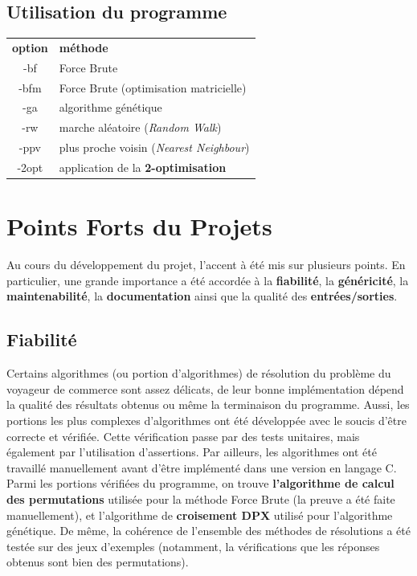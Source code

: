 \documentclass[11pt]{article}
\begin{document}
\subsection*{Utilisation du programme}

\begin{tabular}{ | c | l | }
	\textbf{option}	& \textbf{méthode} \\
	-bf		& Force Brute \\
	-bfm	& Force Brute (optimisation matricielle) \\
	-ga		& algorithme génétique \\
	-rw		& marche aléatoire (\textit{Random Walk}) \\
	-ppv		& plus proche voisin (\textit{Nearest Neighbour}) \\
	-2opt 	& application de la \textbf{2-optimisation} \\
\end{tabular}

\section*{Points Forts du Projets}

Au cours du développement du projet, l'accent à été mis sur plusieurs points. En particulier, une grande importance a été accordée à la \textbf{fiabilité}, la \textbf{généricité}, la \textbf{maintenabilité}, la \textbf{documentation} ainsi que la qualité des \textbf{entrées/sorties}.

\subsection*{Fiabilité}

Certains algorithmes (ou portion d'algorithmes) de résolution du problème du voyageur de commerce sont assez délicats, de leur bonne implémentation dépend la qualité des résultats obtenus ou même la terminaison du programme. Aussi, les portions les plus complexes d'algorithmes ont été développée avec le soucis d'être correcte et vérifiée. Cette vérification passe par des tests unitaires, mais également par l'utilisation d'assertions. Par ailleurs, les algorithmes ont été travaillé manuellement avant d'être implémenté dans une version en langage C. Parmi les portions vérifiées du programme, on trouve \textbf{l'algorithme de calcul des permutations} utilisée pour la méthode Force Brute (la preuve a été faite manuellement), et l'algorithme de \textbf{croisement DPX} utilisé pour l'algorithme génétique. De même, la cohérence de l'ensemble des méthodes de résolutions a été testée sur des jeux d'exemples (notamment, la vérifications que les réponses obtenus sont bien des permutations).
\end{document}
